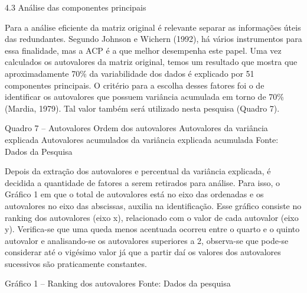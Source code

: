 4.3 Análise das componentes principais

Para a análise eficiente da matriz original  é relevante separar as informações úteis das redundantes. Segundo Johnson e Wichern (1992), há vários instrumentos para essa finalidade, mas a ACP é a que melhor desempenha este papel. 
Uma vez calculados os autovalores da matriz original, temos um resultado que mostra que aproximadamente 70\% da variabilidade dos dados é explicado por 51 componentes principais. O critério para a escolha desses fatores foi o de identificar os autovalores que possuem variância acumulada em torno de 70\% (Mardia, 1979). Tal valor também será utilizado nesta pesquisa (Quadro 7). 

 Quadro 7 – Autovalores  Ordem dos autovalores  Autovalores da variância explicada Autovalores acumulados da variância explicada acumulada
Fonte: Dados da Pesquisa

Depois da extração dos autovalores e percentual da variância explicada, é decidida a quantidade de fatores a serem retirados para análise. Para isso, o Gráfico 1 em que o total de autovalores está no eixo das ordenadas e os autovalores  no eixo das abscissas, auxilia na identificação. Esse gráfico consiste no ranking dos autovalores (eixo x), relacionado com o valor de cada autovalor (eixo y). Verifica-se que uma queda menos acentuada ocorreu entre o quarto e o quinto autovalor e analisando-se os autovalores superiores a 2, observa-se que pode-se considerar até o vigésimo valor já que a partir daí os valores dos autovalores sucessivos são praticamente constantes.
 
Gráfico 1 – Ranking dos autovalores
Fonte: Dados da pesquisa

